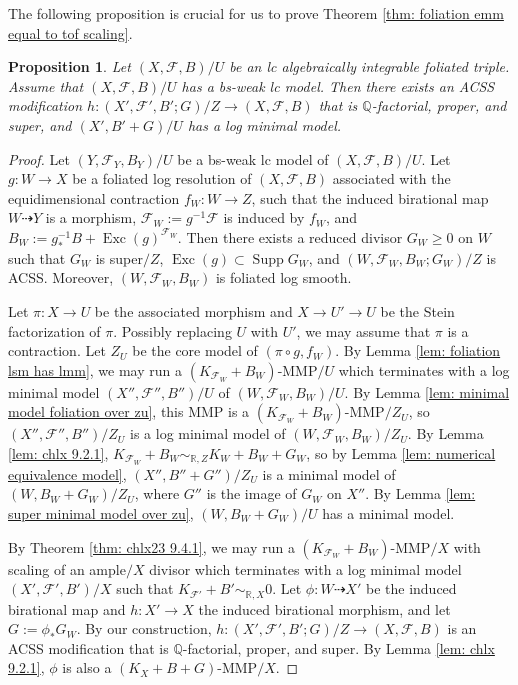 \documentclass[11pt]{amsart}
\numberwithin{equation}{section}
\newcommand{\Qq}{\mathbb{Q}}
\newcommand{\Exc}{\operatorname{Exc}}
\newcommand{\Supp}{\operatorname{Supp}}
\newcommand{\Ff}{\mathcal{F}}
\newtheorem{prop}[thm]{Proposition}
\theoremstyle{definition}
\theoremstyle{definition}
\theoremstyle{definition}
\begin{document}
The following proposition is crucial for us to prove Theorem \ref{thm: foliation emm equal to tof scaling}.

\begin{prop}\label{prop: eolmm foliation to pair}
    Let $(X,\Ff,B)/U$ be an lc algebraically integrable foliated triple. Assume that $(X,\Ff,B)/U$ has a bs-weak lc model. Then there exists an ACSS modification $h: (X',\Ff',B';G)/Z\rightarrow (X,\Ff,B)$ that is $\Qq$-factorial, proper, and super, and $(X',B'+G)/U$ has a log minimal model.
\end{prop}
\begin{proof}


    Let $(Y,\Ff_Y,B_Y)/U$ be a bs-weak lc model of $(X,\Ff,B)/U$. Let $g: W\rightarrow X$ be a foliated log resolution of $(X,\Ff,B)$ associated with the equidimensional contraction $f_W: W\rightarrow Z$, such that the induced birational map $W\dashrightarrow Y$ is a morphism, $\Ff_W:=g^{-1}\Ff$ is induced by $f_W$, and $B_W:=g^{-1}_*B+\Exc(g)^{\Ff_W}$. Then there exists a reduced divisor $G_W\geq 0$ on $W$ such that $G_W$ is super$/Z$, $\Exc(g)\subset\Supp G_W$, and $(W,\Ff_W,B_W;G_W)/Z$ is ACSS. Moreover, $(W,\Ff_W,B_W)$ is foliated log smooth. 

    Let $\pi: X\rightarrow U$ be the associated morphism and $X\rightarrow U'\rightarrow U$ be the Stein factorization of $\pi$. Possibly replacing $U$ with $U'$, we may assume that $\pi$ is a contraction. Let $Z_U$ be the core model of $(\pi\circ g,f_W)$. By Lemma \ref{lem: foliation lsm has lmm}, we may run a $(K_{\Ff_W}+B_W)$-MMP$/U$ which terminates with a log minimal model $(X'',\Ff'',B'')/U$ of $(W,\Ff_W,B_W)/U$. By Lemma \ref{lem: minimal model foliation over zu}, this MMP is a  $(K_{\Ff_W}+B_W)$-MMP$/Z_U$, so $(X'',\Ff'',B'')/Z_U$ is a log minimal model of $(W,\Ff_W,B_W)/Z_U$. By Lemma \ref{lem: chlx 9.2.1}, $K_{\Ff_W}+B_W\sim_{\mathbb R,Z}K_W+B_W+G_W$, so by Lemma \ref{lem: numerical equivalence model}, $(X'',B''+G'')/Z_U$ is a minimal model of $(W,B_W+G_W)/Z_U$, where $G''$ is the image of $G_W$ on $X''$. By Lemma \ref{lem: super minimal model over zu}, $(W,B_W+G_W)/U$ has a minimal model. 

By Theorem \ref{thm: chlx23 9.4.1}, we may run a $(K_{\Ff_W}+B_W)$-MMP$/X$ with scaling of an ample$/X$ divisor which terminates with a log minimal model $(X',\Ff',B')/X$ such that $K_{\Ff'}+B'\sim_{\mathbb R,X}0$. Let $\phi: W\dashrightarrow X'$ be the induced birational map and $h: X'\rightarrow X$ the induced birational morphism, and let $G:=\phi_*G_W$. By our construction,  $h: (X',\Ff',B';G)/Z\rightarrow (X,\Ff,B)$ is an ACSS modification that is $\Qq$-factorial, proper, and super. By Lemma \ref{lem: chlx 9.2.1}, $\phi$ is also a $(K_X+B+G)$-MMP$/X$.


\end{proof}
\end{document}
